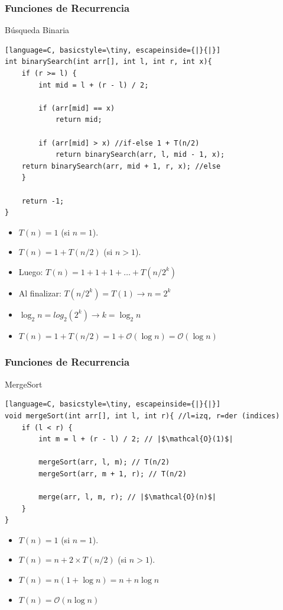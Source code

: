\documentclass{beamer}
\begin{document}
\begin{frame}[fragile]
 \frametitle{Funciones de Recurrencia}
\small
\begin{exampleblock}{Búsqueda Binaria}
\begin{lstlisting}[language=C, basicstyle=\tiny, escapeinside={|}{|}]
int binarySearch(int arr[], int l, int r, int x){
    if (r >= l) {
        int mid = l + (r - l) / 2;

        if (arr[mid] == x) 
            return mid;

        if (arr[mid] > x) //if-else 1 + T(n/2)
            return binarySearch(arr, l, mid - 1, x);
	return binarySearch(arr, mid + 1, r, x); //else
    }

    return -1;
}
\end{lstlisting}
\end{exampleblock}


\begin{itemize}
\item $T(n) = 1$ (si $n = 1$).
\item $T(n) = 1+ T(n/2) $ (si $n > 1$).
\item Luego: $T(n) = 1 + 1 + 1 + \dots + T(n/2^k)$ \pause
\item Al finalizar: $T(n/2^k) = T(1) \rightarrow n = 2^k$ \pause
\item $\log_2 n  = log_2(2^k) \rightarrow k = \log_2 n $ \pause 
\item $ T(n) = 1 + T(n/2) = 1 + \mathcal{O}(\log n) = \mathcal{O}(\log n)$
\end{itemize}
\end{frame}


\begin{frame}[fragile]
 \frametitle{Funciones de Recurrencia}
\small
\begin{exampleblock}{MergeSort}
\begin{lstlisting}[language=C, basicstyle=\tiny, escapeinside={|}{|}]
void mergeSort(int arr[], int l, int r){ //l=izq, r=der (indices)
    if (l < r) {
        int m = l + (r - l) / 2; // |$\mathcal{O}(1)$|

        mergeSort(arr, l, m); // T(n/2)
        mergeSort(arr, m + 1, r); // T(n/2)

        merge(arr, l, m, r); // |$\mathcal{O}(n)$| 
    }
}
\end{lstlisting}
\end{exampleblock}


\begin{itemize}
\item $T(n) = 1$ (si $n = 1$).
\item $T(n) = n + 2 \times T(n/2) $ (si $n > 1$).
\item $T(n) = n (1 + \log n) = n + n \log n$
\item $T(n) = \mathcal{O}(n \log n) $
\end{itemize}
\end{frame}
\end{document}

